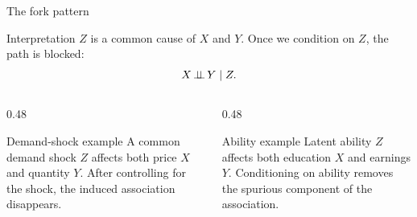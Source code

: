 \documentclass[dvipsnames,aspectratio=169,handout]{beamer}
\begin{document}
\begin{frame}{The fork pattern}
\begin{center}
\end{center}

\begin{alertblock}{Interpretation}
$Z$ is a common cause of $X$ and $Y$.
Once we condition on $Z$, the path is blocked:
\[
X\mbox{\,$\perp\!\!\!\perp$\,} Y\mid Z.
\]
\end{alertblock}

\begin{columns}[T]
\begin{column}{0.48\textwidth}
\begin{block}{Demand-shock example}
A common demand shock $Z$ affects both price $X$ and quantity $Y$.
After controlling for the shock, the induced association disappears.
\end{block}
\end{column}
\begin{column}{0.48\textwidth}
\begin{block}{Ability example}
Latent ability $Z$ affects both education $X$ and earnings $Y$.
Conditioning on ability removes the spurious component of the association.
\end{block}
\end{column}
\end{columns}
\end{frame}
\end{document}
